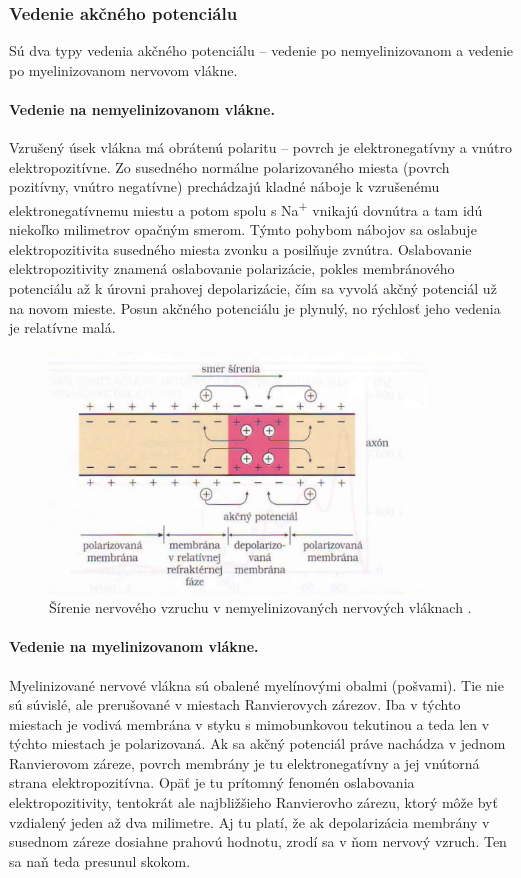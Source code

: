 \subsubsection{Vedenie akčného potenciálu}

Sú dva typy vedenia akčného potenciálu {--} vedenie po nemyelinizovanom a vedenie po myelinizovanom nervovom vlákne.

\paragraph{Vedenie na nemyelinizovanom vlákne.} 
Vzrušený úsek vlákna má obrátenú polaritu {--} povrch je elektronegatívny a vnútro elektropozitívne. Zo susedného normálne polarizovaného miesta (povrch pozitívny, vnútro negatívne) prechádzajú
kladné náboje k vzrušenému elektronegatívnemu miestu a potom spolu s Na\textsuperscript{+} vnikajú dovnútra a tam idú niekoľko milimetrov opačným smerom. Týmto pohybom nábojov sa oslabuje 
elektropozitivita susedného miesta zvonku a posilňuje zvnútra. Oslabovanie elektropozitivity znamená oslabovanie polarizácie, pokles membránového potenciálu až k úrovni prahovej depolarizácie,
čím sa vyvolá akčný potenciál už na novom mieste. Posun akčného potenciálu je plynulý, no rýchlosť jeho vedenia je relatívne malá.

\begin{figure}[!htbp]
  \centering
  \includegraphics[width=10cm]{img/nemyelin.png}
  \caption{Šírenie nervového vzruchu v nemyelinizovaných nervových vláknach \cite{javorkaLekarskaFyziologiaUcebnica2001}.}
  \label{nemyelin}
\end{figure}

\paragraph{Vedenie na myelinizovanom vlákne.}
Myelinizované nervové vlákna sú obalené myelínovými obalmi (pošvami). Tie nie sú súvislé, ale prerušované v miestach Ranvierovych zárezov. Iba v týchto miestach je vodivá membrána v styku s mimobunkovou 
tekutinou a teda len v týchto miestach je polarizovaná. Ak sa akčný potenciál práve nachádza v jednom Ranvierovom záreze, povrch membrány je tu elektronegatívny a jej vnútorná strana 
elektropozitívna. Opäť je tu prítomný fenomén oslabovania elektropozitivity, tentokrát ale najbližšieho Ranvierovho zárezu, ktorý môže byť vzdialený jeden až dva milimetre. Aj tu platí, že ak
depolarizácia membrány v susednom záreze dosiahne prahovú hodnotu, zrodí sa v ňom nervový vzruch. Ten sa naň teda presunul skokom. 

